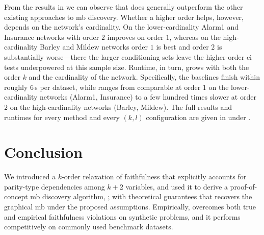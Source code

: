 \documentclass[accepted]{uai2026} %
\theoremstyle{plain}
\theoremstyle{definition}
\theoremstyle{remark}
\begin{document}
From the results in  we can observe that {\method} does
generally outperform the other existing approaches to \gls{mb}
discovery. Whether a higher order helps, however, depends on the network's
cardinality. On the lower-cardinality Alarm1 and Insurance networks
{\method} with order $2$ improves on order $1$, whereas on the
high-cardinality Barley and Mildew networks order $1$ is best and order
$2$ is substantially worse---there the larger conditioning sets leave the
higher-order \gls{ci} tests underpowered at this sample size. Runtime, in
turn, grows with both the order $k$ and the cardinality of the
network. Specifically, the baselines finish within roughly $6$\,s per
dataset, while {\method} ranges from comparable at order $1$ on the
lower-cardinality networks (Alarm1, Insurance) to a few hundred times
slower at order $2$ on the high-cardinality networks (Barley,
Mildew). The full results and runtimes for every method and every
$(k,l)$ configuration are given in 
under .

%   

%   

\section{Conclusion}
We introduced a $k$-order relaxation of faithfulness that explicitly
accounts for parity-type dependencies among $k{+}2$ variables, and used
it to derive a proof-of-concept \acrfull{mb} discovery algorithm,
{\method}; with theoretical guarantees that {\method} recovers the 
graphical \gls{mb} under the proposed assumptions. 
Empirically, {\method} overcomes both true and empirical
faithfulness violations on synthetic problems, and it performs
competitively on commonly used benchmark datasets.
\end{document}

